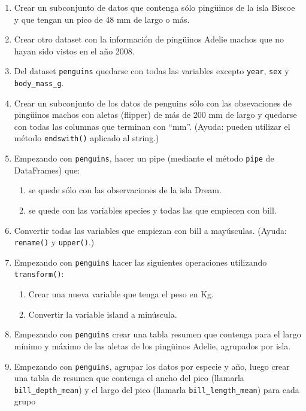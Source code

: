 \documentclass[a4paper,11pt]{article}
\theoremstyle{definition}
\begin{document}
\begin{enumerate}

\item Crear un subconjunto de datos que contenga sólo ping\"uinos de la isla Biscoe y que tengan un pico de 48 mm de largo o más.
\item Crear otro dataset con la información de ping\"uinos Adelie machos que no hayan sido vistos en el año 2008.
\item Del dataset \lstinline{penguins} quedarse con todas las variables excepto \lstinline{year}, \lstinline{sex} y \lstinline{body_mass_g}.
\item Crear un subconjunto de los datos de penguins sólo con las obsevaciones de ping\"uinos machos con aletas (flipper) de más de 200 mm de largo y quedarse con todas las columnas que terminan con “mm”. (Ayuda: pueden utilizar el método \lstinline{endswith()} aplicado al string.)


\item Empezando con \lstinline{penguins}, hacer un pipe (mediante el método \lstinline{pipe} de DataFrames) que:
\begin{enumerate}
\item se quede sólo con las observaciones de la isla Dream.
\item se quede con las variables species y todas las que empiecen con bill.
\end{enumerate}

\item Convertir todas las variables que empiezan con bill a mayúsculas. (Ayuda: \lstinline{rename()} y \lstinline{upper()}.)

\item Empezando con \lstinline{penguins} hacer las siguientes operaciones utilizando \lstinline{transform()}:
\begin{enumerate}
\item Crear una nueva variable que tenga el peso en Kg.
\item Convertir la variable island a minúscula.
\end{enumerate}

\item Empezando con \lstinline{penguins} crear una tabla resumen que contenga para el largo mínimo y máximo de las aletas de los ping\"uinos Adelie, agrupados por isla.

\item Empezando con \lstinline{penguins}, agrupar los datos por especie y año, luego crear una tabla de resumen que contenga el ancho del pico (llamarla \lstinline{bill_depth_mean}) y el largo del pico (llamarla \lstinline{bill_length_mean}) para cada grupo


\end{enumerate}
\end{document}
